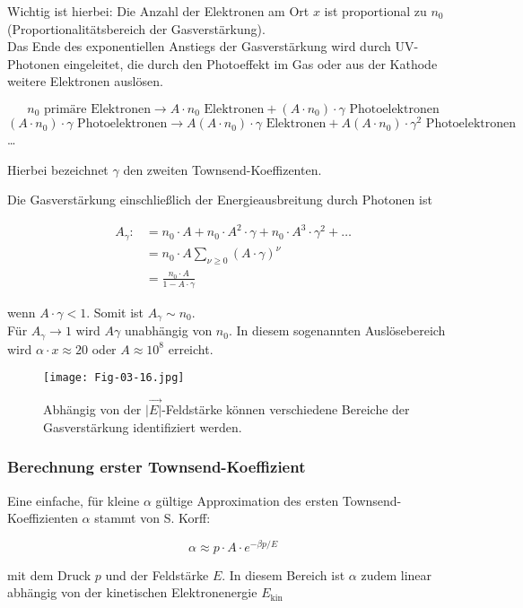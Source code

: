 Wichtig ist hierbei: Die Anzahl der Elektronen am Ort $x$ ist proportional zu $n_0$
(Proportionalitätsbereich der Gasverstärkung).
\\
Das Ende des exponentiellen Anstiegs der Gasverstärkung wird durch UV-Photonen eingeleitet, die
durch den Photoeffekt im Gas oder aus der Kathode weitere Elektronen auslösen.

\[n_0 \text{ primäre Elektronen} \longrightarrow A\cdot n_0 \text{ Elektronen} + (A\cdot n_0)\cdot
\gamma \text{ Photoelektronen}\]
\[(A\cdot n_0)\cdot\gamma \text{ Photoelektronen} \longrightarrow A(A\cdot n_0)\cdot \gamma
\text{ Elektronen} + A(A\cdot n_0)\cdot \gamma^2 \text{ Photoelektronen}\]
\ldots

Hierbei bezeichnet $\gamma$ den zweiten Townsend-Koeffizenten.

Die Gasverstärkung einschließlich der Energieausbreitung durch Photonen ist


\begin{align*}
A_\gamma :&= n_0\cdot A + n_0\cdot A^2\cdot\gamma + n_0\cdot A^3\cdot\gamma^2 + \ldots\\
&=n_0\cdot A \sum_{\nu\geq0}(A\cdot\gamma)^\nu  \\
&= \frac{n_0\cdot A}{1- A\cdot\gamma}
\end{align*}

wenn $A\cdot\gamma<1$. Somit ist $A_\gamma\sim n_0$.
\\
Für $A_\gamma\rightarrow 1$ wird $A\gamma$ unabhängig von $n_0$. In diesem sogenannten
Auslösebereich wird $\alpha\cdot x\approx 20$ oder $A\approx10^8$ erreicht.

\begin{figure}[H]
	\centering
	\texttt{[image: Fig-03-16.jpg]}
	\caption{Abhängig von der $|\vec{E|}$-Feldstärke können verschiedene Bereiche der Gasverstärkung
	identifiziert werden.}
\end{figure}

\subsubsection*{Berechnung erster Townsend-Koeffizient}

Eine einfache, für kleine $\alpha$ gültige Approximation des ersten Townsend-Koeffizienten $\alpha$
stammt von S. Korff:

\[\alpha \approx p\cdot A\cdot e^{-\beta p/E}  \]

mit dem Druck $p$ und der Feldstärke $E$. In diesem Bereich ist $\alpha$ zudem linear abhängig von
der kinetischen Elektronenergie $E_\text{kin}$

